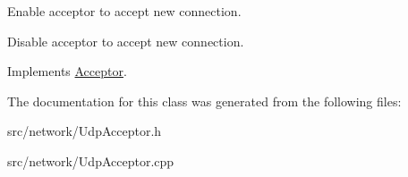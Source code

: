 Enable acceptor to accept new connection. 

Disable acceptor to accept new connection. 

Implements \hyperlink{class_acceptor_a624e3c004d6bdc7c1b5238aef1bb2e29}{Acceptor}.



The documentation for this class was generated from the following files\-:\begin{DoxyCompactItemize}
\item 
src/network/Udp\-Acceptor.\-h\item 
src/network/Udp\-Acceptor.\-cpp\end{DoxyCompactItemize}
